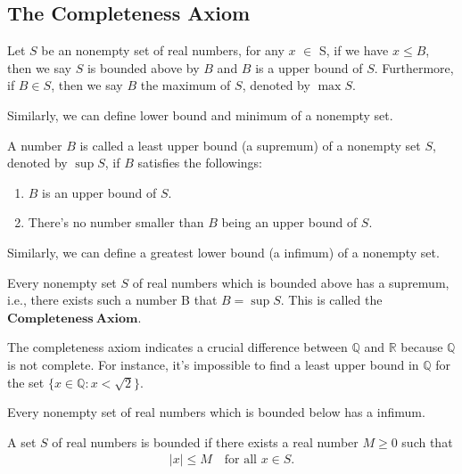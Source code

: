 \documentclass[a4paper]{ctexart}
\begin{document}
	\subsection{The Completeness Axiom}
	\begin{mydef}\label{def_of_upb}
		Let $S$ be an nonempty set of real numbers, for any $x$ $\in$ S, if we have	$x\le B$, then we say $S$ is bounded above by $B$ and $B$ is a upper bound of $S$. Furthermore, if $B\in S$, then we say $B$ the maximum of $S$, denoted by $\max S$. 
	\end{mydef}
	\begin{myrmk}
		Similarly, we can define lower bound and minimum of a nonempty set.
	\end{myrmk}
	\begin{mydef}
		A number $B$ is called a least upper bound (a supremum) of a nonempty set $S$, denoted by $\sup S$, if $B$ satisfies the followings:
		\begin{enumerate}
			\item $B$ is an upper bound of $S$.
			\item There's no number smaller than $B$ being an upper bound of $S$.
		\end{enumerate}
	\end{mydef}
	\begin{myrmk}
		Similarly, we can define a greatest lower bound (a infimum) of a nonempty set.
	\end{myrmk}
	\begin{myax}
		Every nonempty set $S$ of real numbers which is bounded above has a supremum, i.e., there exists such a number B that $B=\sup S$. This is called the $\mathbf{ Completeness\ Axiom}$.
	\end{myax}
	\begin{myrmk}
		The completeness axiom indicates a crucial difference between $\mathbb{Q}$ and $\mathbb{R}$ because $\mathbb{Q}$ is not complete. For instance, it's impossible to find a least upper bound in $\mathbb{Q}$ for the set $\{ x\in \mathbb{Q}:x<\sqrt{2}\}$.
	\end{myrmk}
	\begin{mythm}
		Every nonempty set of real numbers which is bounded below has a infimum.
	\end{mythm}
	\begin{mydef}
		A set $S$ of real numbers is bounded if there exists a real number $M\ge 0$ such that
		\begin{align*}
			|x|\le M\quad \text{for all } x \in S.
		\end{align*}
	\end{mydef}
\end{document}
